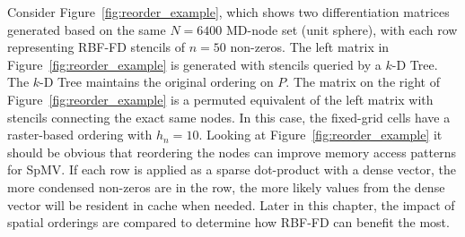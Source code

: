 \documentclass{report}
\begin{document}
Consider Figure~\ref{fig:reorder_example}, which shows two differentiation matrices generated based on the same $N=6400$ MD-node set (unit sphere), with each row representing RBF-FD stencils of $n=50$ non-zeros. The left matrix in Figure~\ref{fig:reorder_example} is generated with stencils queried by a $k$-D Tree. The $k$-D Tree maintains the original ordering on $P$. The matrix on the right of Figure~\ref{fig:reorder_example} is a permuted equivalent of the left matrix with stencils connecting the exact same nodes. In this case, the fixed-grid cells have a raster-based ordering with $h_n = 10$. Looking at Figure~\ref{fig:reorder_example} it should be obvious that reordering the nodes can improve memory access patterns for SpMV. If each row is applied as a sparse dot-product with a dense vector, the more condensed non-zeros are in the row, the more likely values from the dense vector will be resident in cache when needed. Later in this chapter, the impact of spatial orderings are compared to determine how RBF-FD can benefit the most. 
\end{document}
